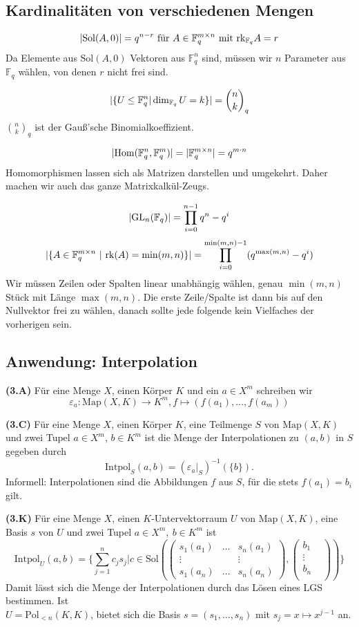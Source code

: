 \documentclass[a4paper,parskip=half*,DIV=15,fontsize=11pt]{scrartcl}
\newlength{\hangwidth}
\newcommand{\skript}[1]{\settowidth{\hangwidth}{\textbf{(#1)} }\hangpara{\hangwidth}{1}\textbf{(#1)} \ignorespaces} %
\newcommand{\Sol}{\mathrm{Sol}} %
\newcommand{\rk}{\mathrm{rk}} %
\newcommand{\GL}{\mathrm{GL}} %
\newcommand{\Map}{\mathrm{Map}} %
\newcommand{\Pol}{\mathrm{Pol}} %
\newcommand{\Field}{\mathbb{F}} %
\newcommand{\Intpol}{\mathrm{Intpol}}
\DeclarePairedDelimiter\abs{\lvert}{\rvert} %
\begin{document}
\subsection{Kardinalitäten von verschiedenen Mengen}

$$\abs{\Sol(A,0)} = q^{n-r} \text{ für } A \in \Field_q^{m \times n} \text{ mit } \rk_{\Field_q} A = r$$
Da Elemente aus $\Sol(A,0)$ Vektoren aus $\Field_q^n$ sind, müssen wir $n$ Parameter aus $\Field_q$ wählen, von denen $r$ nicht frei sind.

$$\abs{\{ U \leq \Field_q^n | \dim_{\Field_q} U = k \}} = \binom{n}{k}_q$$
$\binom{n}{k}_q$ ist der Gauß'sche Binomialkoeffizient.

$$\abs{\mathrm{Hom}(\Field_q^n,\Field_q^m)} = \abs{\Field_q^{m \times n}} = q^{m \cdot n}$$
Homomorphismen lassen sich als Matrizen darstellen und umgekehrt. Daher machen wir auch das ganze Matrixkalkül-Zeugs.

$$\abs{\GL_n(\Field_q)} = \prod_{i=0}^{n-1} q^n-q^i$$
$$\abs{\{A \in \Field_q^{m \times n} ~ | ~ \rk(A) = \min(m,n)\}} = \prod_{i=0}^{\min(m,n)-1} (q^{\max(m,n)}-q^i)$$
Wir müssen Zeilen oder Spalten linear unabhängig wählen, genau $\min(m,n)$ Stück mit Länge $\max(m,n)$. Die erste Zeile/Spalte ist dann bis auf den Nullvektor frei zu wählen, danach sollte jede folgende kein Vielfaches der vorherigen sein.

\subsection{Anwendung: Interpolation}
\skript{3.A} Für eine Menge $X$, einen Körper $K$ und ein $a \in X^m$ schreiben wir
$$\varepsilon_a:\Map(X,K) \to K^m, f \mapsto (f(a_1),\dots,f(a_m))$$

\skript{3.C} Für eine Menge $X$, einen Körper $K$, eine Teilmenge $S$ von $\Map(X,K)$ und zwei Tupel $a \in X^m$, $b\in K^m$ ist die Menge der Interpolationen zu $(a,b)$ in $S$ gegeben durch
$$\Intpol_S(a,b)=(\varepsilon_a|_S)^{-1}(\{b\}).$$
Informell: Interpolationen sind die Abbildungen $f$ aus $S$, für die stets $f(a_1)=b_i$ gilt.

\skript{3.K} Für eine Menge $X$, einen $K$-Untervektorraum $U$ von $\Map(X,K)$, eine Basis $s$ von $U$ und zwei Tupel $a \in X^m,\ b \in K^m$ ist
$$\Intpol_U(a,b)=\{\sum_{j=1}^{n}c_j s_j | c \in \Sol(
	\left(\begin{array}{ccc}
	s_1(a_1)& \dots & s_n(a_1)	\\
	\vdots & &  \vdots	\\
	s_1(a_n) & \dots & s_n(a_n)
	\end{array}\right),
	\left(\begin{array}{cc}
	b_1 &\\
	\vdots &\\
	b_n &\\
	\end{array}\right)
	)\}$$
Damit lässt sich die Menge der Interpolationen durch das Lösen eines LGS bestimmen. Ist\\ $U = \Pol_{<n}(K,K)$, bietet sich die Basis $s=(s_1,\dots,s_n)$ mit $s_j= x \mapsto x^{j-1}$ an.
\end{document}
